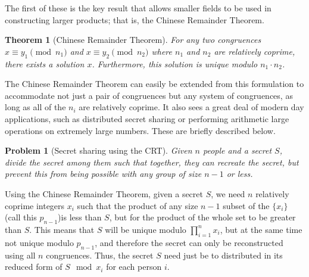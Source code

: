 \documentclass[pageno]{jpaper}
\newtheorem{theorem}{Theorem}[section]
\newtheorem{problem}{Problem}[section]
\begin{document}
The first of these is the key result that allows smaller fields to be used in constructing larger products; that is, the Chinese Remainder Theorem.
\begin{theorem}[Chinese Remainder Theorem]
  For any two congruences $x\equiv y_1\pmod n_1$ and $x\equiv y_2\pmod n_2$ where $n_1$ and $n_2$ are relatively coprime, there exists a solution $x$.
  Furthermore, this solution is unique modulo $n_1\cdot n_2$.
\end{theorem}
The Chinese Remainder Theorem can easily be extended from this formulation to accommodate not just a pair of congruences but any system of congruences, as long as all of the $n_i$ are relatively coprime.
It also sees a great deal of modern day applications, such as distributed secret sharing or performing arithmetic large operations on extremely large numbers.
These are briefly described below.

\begin{problem}[Secret sharing using the CRT]
  Given $n$ people and a secret $S$, divide the secret among them such that together, they can recreate the secret, but prevent this from being possible with any group of size $n-1$ or less.
\end{problem}
Using the Chinese Remainder Theorem, given a secret $S$, we need $n$ relatively coprime integers $x_i$ such that the product of any size $n-1$ subset of the $\{x_i\}$ (call this $p_{n-1}$)is less than $S$, but for the product of the whole set to be greater than $S$.
This means that $S$ will be unique modulo $\prod_{i=1}^n x_i$, but at the same time not unique modulo $p_{n-1}$, and therefore the secret can only be reconstructed using all $n$ congruences.
Thus, the secret $S$ need just be to distributed in its reduced form of $S\mod x_i$ for each person $i$.
\end{document}
